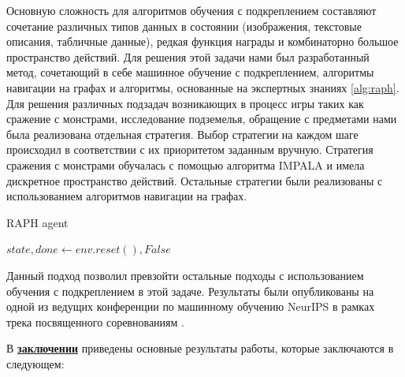 Основную сложность для алгоритмов обучения с подкреплением составляют сочетание различных типов данных в состоянии (изображения, текстовые описания, табличные данные), редкая функция награды и комбинаторно большое пространство действий. Для решения этой задачи нами был разработанный метод, сочетающий в себе машинное обучение с подкреплением, алгоритмы навигации на графах и алгоритмы, основанные на экспертных знаниях \ref{alg:raph}. Для решения различных подзадач возникающих в процесс игры таких как сражение с монстрами, исследование подземелья, обращение с предметами нами была реализована отдельная стратегия. Выбор стратегии на каждом шаге происходил в соответствии с их приоритетом заданным вручную. Стратегия сражения с монстрами обучалась с помощью алгоритма IMPALA \cite{impala} и имела дискретное пространство действий. Остальные стратегии были реализованы с использованием алгоритмов навигации на графах. 

\begin{algorithm}[H]
\caption{RAPH agent}\label{alg:raph}
$state, done \gets env.reset(), False$\;

\end{algorithm}

Данный подход позволил превзойти остальные подходы с использованием обучения с подкреплением в этой задаче. Результаты были опубликованы на одной из ведущих конференции по машинному обучению NeurIPS в рамках трека посвященного соревнованиям \autocite{confbib3}.

\FloatBarrier
{}                                  %
В \underline{\textbf{заключении}} приведены основные результаты работы, которые заключаются в следующем:



